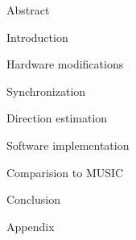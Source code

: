 

\usepackage{antropy_en}


  

  \begin{topchapter}{Abstract}
    
  \end{topchapter}

  \begin{topchapter}{Introduction}
    
  \end{topchapter}

  \begin{topchapter}{Hardware modifications}
    
  \end{topchapter}

  \begin{topchapter}{Synchronization}
    
  \end{topchapter}

  \begin{topchapter}{Direction estimation}
    
  \end{topchapter}

  \begin{topchapter}{Software implementation}
    
  \end{topchapter}

  \begin{topchapter}{Comparision to MUSIC}
    
  \end{topchapter}

  \begin{topchapter}{Conclusion}
    
  \end{topchapter}

  \newpage

  \begin{topchapter}{Appendix}
    
  \end{topchapter}

